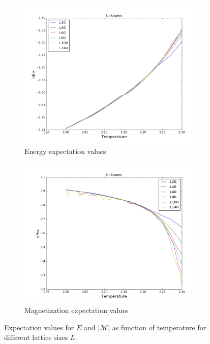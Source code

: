\documentclass{article}
\begin{document}
\begin{figure}[H]
  \centering
  \begin{subfigure}{0.49\textwidth}
    \includegraphics[scale=0.29]{../figures/task_e/energyeig.png}
    \caption{Energy expectation values}
  \end{subfigure}
  \begin{subfigure}{0.49\textwidth}
    \includegraphics[scale=0.29]{../figures/task_e/Mageig.png}
    \caption{Magnetization expectation values}
  \end{subfigure}
  \caption{Expectation values for $E$ and $|\mathcal{M}|$ as function of temperature for different lattice sizes $L$.}
  \label{fig:ee}
\end{figure}
\end{document}
